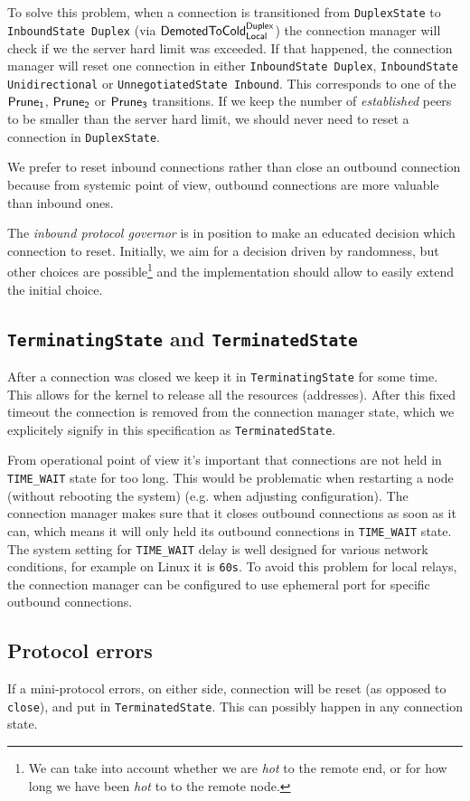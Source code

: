 \documentclass{article}
\def\UnnegotiatedStateIn{\texttt{UnnegotiatedState Inbound}}
\def\DuplexState{\texttt{DuplexState}}
\def\InboundStateUni{\texttt{InboundState Unidirectional}}
\def\InboundStateDup{\texttt{InboundState Duplex}}
\def\TerminatingState{\texttt{TerminatingState}}
\def\TerminatedState{\texttt{TerminatedState}}
\def\DemotedToColdDupLoc{$\text{\textsf{DemotedToCold}}^\text{\textsf{Duplex}}_\text{\textsf{Local}}$}
\def\PruneA{$\text{\textsf{Prune}}_\text{\textsf{1}}$}
\def\PruneB{$\text{\textsf{Prune}}_\text{\textsf{2}}$}
\def\PruneC{$\text{\textsf{Prune}}_\text{\textsf{3}}$}
\def\hot{\textit{hot}}
\def\established{\textit{established}}
\begin{document}
To solve this problem, when a connection is transitioned from 
\DuplexState{} to \InboundStateDup{} (via \DemotedToColdDupLoc{}) the
connection manager will check if we the server hard limit was exceeded.  If
that happened, the connection manager will reset one connection in either
\InboundStateDup{}, \InboundStateUni{} or \UnnegotiatedStateIn{}.  This
corresponds to one of the \PruneA{}, \PruneB{} or \PruneC{} transitions.  If we
keep the number of \established{} peers to be smaller than the server hard
limit, we should never need to reset a connection in \DuplexState{}.

We prefer to reset inbound connections rather than close an outbound connection
because from systemic point of view, outbound connections are more valuable
than inbound ones.

The \textit{inbound protocol governor} is in position to make an educated
decision which connection to reset.  Initially, we aim for a decision driven by
randomness, but other choices are possible\footnote{We can take into account
whether we are \hot{} to the remote end, or for how long we have been \hot{} to
to the remote node.} and the implementation should allow to easily extend the
initial choice.

\subsection{\TerminatingState{} and \TerminatedState{}}
After a connection was closed we keep it in \TerminatingState{} for some time.
This allows for the kernel to release all the resources (addresses).  After
this fixed timeout the connection is removed from the connection manager state,
which we explicitely signify in this specification as \TerminatedState{}.

From operational point of view it's important that connections are not held in
\texttt{TIME\_WAIT} state for too long.  This would be problematic when
restarting a node (without rebooting the system) (e.g. when adjusting
configuration).  The connection manager makes sure that it closes outbound
connections as soon as it can, which means it will only held its outbound
connections in \texttt{TIME\_WAIT} state.  The system setting for
\texttt{TIME\_WAIT} delay is well designed for various network conditions, for
example on Linux it is \texttt{60s}.  To avoid this problem for local relays,
the connection manager can be configured to use ephemeral port for specific
outbound connections.

\subsection{Protocol errors}
If a mini-protocol errors, on either side, connection will be reset (as opposed
to \texttt{close}), and put in \TerminatedState{}.  This can possibly happen in
any connection state.
\end{document}
